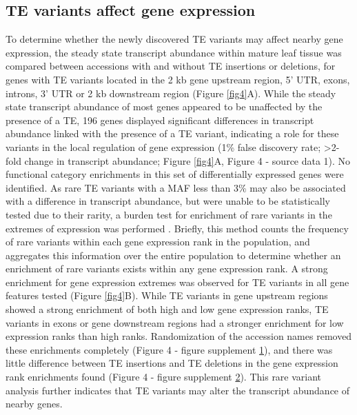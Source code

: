 \documentclass[12pt]{article}
\begin{document}
\subsection{TE variants affect gene expression}

To determine whether the newly discovered TE variants may affect
nearby gene expression, the steady state transcript abundance within
mature leaf tissue was compared between accessions with and without TE
insertions or deletions, for genes with TE variants located in the 2
kb gene upstream region, 5' UTR, exons, introns, 3' UTR or 2 kb
downstream region (Figure \ref{fig4}A). While the steady state transcript
abundance of most genes appeared to be unaffected by the presence of a
TE, 196 genes displayed significant differences in transcript
abundance linked with the presence of a TE variant, indicating a role
for these variants in the local regulation of gene expression (1\%
false discovery rate; \textgreater{}2-fold change in transcript
abundance; Figure \ref{fig4}A, Figure 4 - source data 1). No functional
category enrichments in this set of differentially expressed genes
were identified. As rare TE variants with a MAF less than 3\% may also
be associated with a difference in transcript abundance, but were
unable to be statistically tested due to their rarity, a burden test
for enrichment of rare variants in the extremes of expression was
performed \cite{Zhao:2016gc}. Briefly, this method counts the
frequency of rare variants within each gene expression rank in the
population, and aggregates this information over the entire population
to determine whether an enrichment of rare variants exists within any
gene expression rank. A strong enrichment for gene expression extremes
was observed for TE variants in all gene features tested (Figure
\ref{fig4}B). While TE variants in gene upstream regions showed a
strong enrichment of both high and low gene expression ranks, TE
variants in exons or gene downstream regions had a stronger enrichment
for low expression ranks than high ranks. Randomization of the
accession names removed these enrichments completely (Figure 4 -
figure supplement \hyperref[fig4s1]{1}), and there was little
difference between TE insertions and TE deletions in the gene
expression rank enrichments found (Figure 4 - figure supplement
\hyperref[fig4s2]{2}). This rare variant analysis further indicates
that TE variants may alter the transcript abundance of nearby genes.
\end{document}
